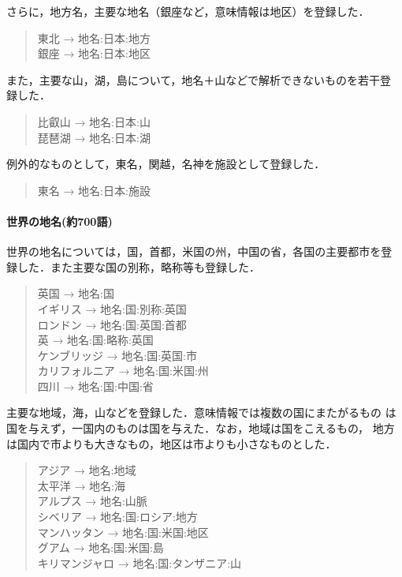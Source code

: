 \documentclass[a4j,titlepage]{jarticle}
\begin{document}
さらに，地方名，主要な地名（銀座など，意味情報は地区）を登録した．

\begin{quote}
東北 → 地名:日本:地方 \\
銀座 → 地名:日本:地区 \\
\end{quote}

また，主要な山，湖，島について，地名＋山などで解析できないものを若干登
録した．

\begin{quote}
比叡山 → 地名:日本:山 \\
琵琶湖 → 地名:日本:湖 \\
\end{quote}

例外的なものとして，東名，関越，名神を施設として登録した．

\begin{quote}
東名 → 地名:日本:施設 \\
\end{quote}

\paragraph{世界の地名(約700語)}

世界の地名については，国，首都，米国の州，中国の省，各国の主要都市を登
録した．また主要な国の別称，略称等も登録した．

\begin{quote}
英国 → 地名:国 \\
イギリス → 地名:国:別称:英国 \\
ロンドン → 地名:国:英国:首都 \\
英 → 地名:国:略称:英国 \\
ケンブリッジ → 地名:国:英国:市 \\
カリフォルニア  → 地名:国:米国:州 \\
四川  → 地名:国:中国:省 \\
\end{quote}

主要な地域，海，山などを登録した．意味情報では複数の国にまたがるもの
は国を与えず，一国内のものは国を与えた．なお，地域は国をこえるもの，
地方は国内で市よりも大きなもの，地区は市よりも小さなものとした．

\begin{quote}
アジア → 地名:地域 \\
太平洋 → 地名:海 \\
アルプス → 地名:山脈 \\
シベリア → 地名:国:ロシア:地方 \\
マンハッタン → 地名:国:米国:地区 \\
グアム → 地名:国:米国:島 \\
キリマンジャロ → 地名:国:タンザニア:山 \\
\end{quote}
\end{document}
